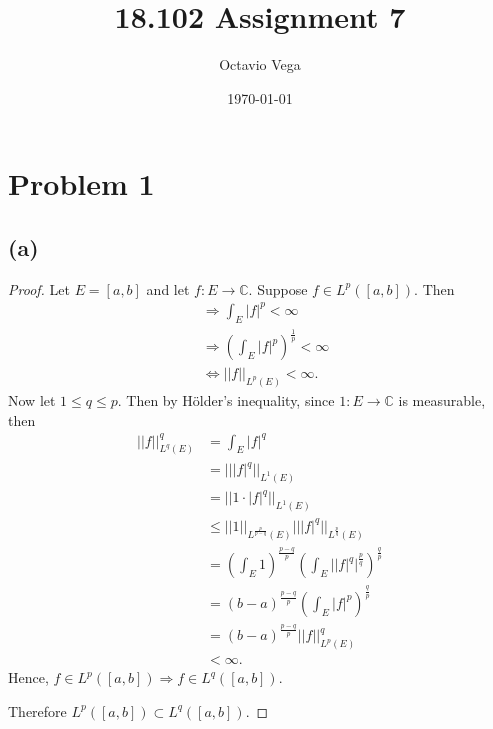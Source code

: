 \documentclass{article}
\title{18.102 Assignment 7}
\author{Octavio Vega}
\date\today
\newcommand{\C}{\mathbb{C}} %
\begin{document}
\maketitle
	
\section*{Problem 1}
\subsection*{(a)}
\begin{proof}
	Let $E = [a, b]$ and let $f: E \to \C$. Suppose $f \in L^p([a, b])$. Then
	\begin{align}
		&\Rightarrow \int_E |f|^p < \infty \\
		&\Rightarrow \left(\int_E |f|^p\right)^\frac{1}{p} < \infty \\
		&\iff ||f||_{L^p(E)} < \infty.
	\end{align}
	Now let $1 \leq q \leq p$. Then by Hölder's inequality, since $1: E \to \C$ is measurable, then
	\begin{align}
		||f||_{L^q(E)}^q &= \int_E |f|^q \\
		&= || |f|^q||_{L^1(E)} \\
		&= || 1 \cdot |f|^q||_{L^1(E)} \\
		& \leq ||1||_{L^{\frac{p}{p-q}}(E)} || |f|^q||_{L^{\frac{p}{q}}(E)} \\
		&= \left(\int_E 1\right)^{\frac{p-q}{p}} \left(\int_E \Big||f|^q\Big|^{\frac{p}{q}}\right)^{\frac{q}{p}} \\
		&= (b - a)^{\frac{p-q}{p}} \left(\int_E |f|^p\right)^{\frac{q}{p}} \\
		&= (b - a)^{\frac{p-q}{p}} ||f||_{L^p(E)}^q \\
		&< \infty.
	\end{align}
	Hence, $f \in L^p([a, b]) \Rightarrow f \in L^q ([a, b])$.
	
	Therefore $L^p([a, b]) \subset L^q([a, b])$. 
\end{proof}
\end{document}
